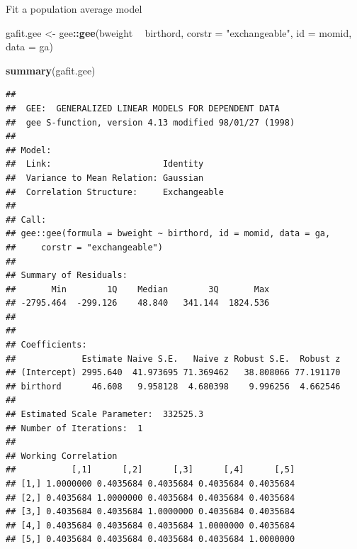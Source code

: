 \documentclass[
  ignorenonframetext,
]{beamer}
\newenvironment{Shaded}{\begin{snugshade}}{\end{snugshade}}
\newcommand{\DataTypeTok}[1]{\textcolor[rgb]{0.13,0.29,0.53}{#1}}
\newcommand{\KeywordTok}[1]{\textcolor[rgb]{0.13,0.29,0.53}{\textbf{#1}}}
\newcommand{\NormalTok}[1]{#1}
\newcommand{\OperatorTok}[1]{\textcolor[rgb]{0.81,0.36,0.00}{\textbf{#1}}}
\newcommand{\StringTok}[1]{\textcolor[rgb]{0.31,0.60,0.02}{#1}}
\begin{document}
\begin{frame}[fragile]{Fit a population average model}
\protect\hypertarget{fit-a-population-average-model}{}

\begin{Shaded}
\begin{Highlighting}[]
\NormalTok{gafit.gee <-}\StringTok{ }\NormalTok{gee}\OperatorTok{::}\KeywordTok{gee}\NormalTok{(bweight }\OperatorTok{~}\StringTok{ }\NormalTok{birthord,}
                      \DataTypeTok{corstr =} \StringTok{"exchangeable"}\NormalTok{,}
                      \DataTypeTok{id =}\NormalTok{ momid,}
                      \DataTypeTok{data =}\NormalTok{ ga)}
\end{Highlighting}
\end{Shaded}

\end{frame}

\begin{frame}[fragile]{}
\protect\hypertarget{section}{}

\tiny

\begin{Shaded}
\begin{Highlighting}[]
\KeywordTok{summary}\NormalTok{(gafit.gee)}
\end{Highlighting}
\end{Shaded}

\begin{verbatim}
## 
##  GEE:  GENERALIZED LINEAR MODELS FOR DEPENDENT DATA
##  gee S-function, version 4.13 modified 98/01/27 (1998) 
## 
## Model:
##  Link:                      Identity 
##  Variance to Mean Relation: Gaussian 
##  Correlation Structure:     Exchangeable 
## 
## Call:
## gee::gee(formula = bweight ~ birthord, id = momid, data = ga, 
##     corstr = "exchangeable")
## 
## Summary of Residuals:
##       Min        1Q    Median        3Q       Max 
## -2795.464  -299.126    48.840   341.144  1824.536 
## 
## 
## Coefficients:
##             Estimate Naive S.E.   Naive z Robust S.E.  Robust z
## (Intercept) 2995.640  41.973695 71.369462   38.808066 77.191170
## birthord      46.608   9.958128  4.680398    9.996256  4.662546
## 
## Estimated Scale Parameter:  332525.3
## Number of Iterations:  1
## 
## Working Correlation
##           [,1]      [,2]      [,3]      [,4]      [,5]
## [1,] 1.0000000 0.4035684 0.4035684 0.4035684 0.4035684
## [2,] 0.4035684 1.0000000 0.4035684 0.4035684 0.4035684
## [3,] 0.4035684 0.4035684 1.0000000 0.4035684 0.4035684
## [4,] 0.4035684 0.4035684 0.4035684 1.0000000 0.4035684
## [5,] 0.4035684 0.4035684 0.4035684 0.4035684 1.0000000
\end{verbatim}

\end{frame}
\end{document}
